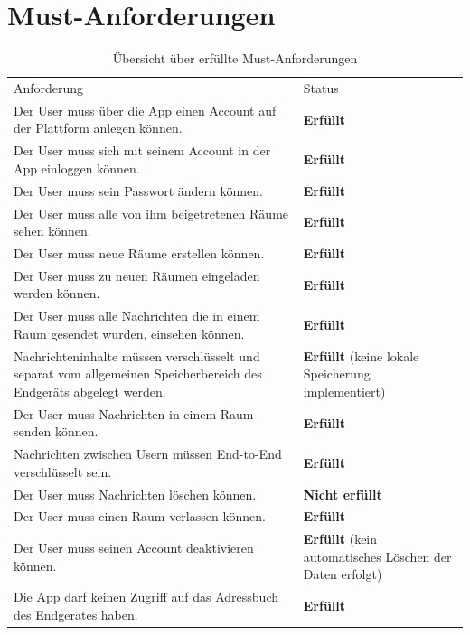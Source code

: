     \newpage
    \section{Must-Anforderungen}\label{sec:must-anforderungen}
    \begin{table}[h]
        \centering
        \begin{tabular}{p{}|p{}}
            Anforderung & Status\\
            \cline{1-2}
            Der User muss über die App einen Account auf der Plattform anlegen können.
            &  \textbf{Erfüllt} \\
            \cline{1-2}
            Der User muss sich mit seinem Account in der App einloggen können. &  \textbf{Erfüllt} \\
            \cline{1-2}
            Der User muss sein Passwort ändern können. & \textbf{Erfüllt}  \\
            \cline{1-2}
            Der User muss alle von ihm beigetretenen Räume sehen können. &  \textbf{Erfüllt} \\
            \cline{1-2}
            Der User muss neue Räume erstellen können. & \textbf{Erfüllt} \\
            \cline{1-2}
            Der User muss zu neuen Räumen eingeladen werden können. & \textbf{Erfüllt} \\
            \cline{1-2}
            Der User muss alle Nachrichten die in einem Raum gesendet wurden, einsehen können. & \textbf{Erfüllt} \\
            \cline{1-2}
            Nachrichteninhalte müssen verschlüsselt und separat vom allgemeinen Speicherbereich des Endgeräts abgelegt werden. & \textbf{Erfüllt} (keine lokale Speicherung implementiert) \\
            \cline{1-2}
            Der User muss Nachrichten in einem Raum senden können. & \textbf{Erfüllt} \\
            \cline{1-2}
            Nachrichten zwischen Usern müssen End-to-End verschlüsselt sein. & \textbf{Erfüllt} \\
            \cline{1-2}
            Der User muss Nachrichten löschen können. & \textbf{Nicht erfüllt} \\
            \cline{1-2}
            Der User muss einen Raum verlassen können. & \textbf{Erfüllt} \\
            \cline{1-2}
            Der User muss seinen Account deaktivieren können. & \textbf{Erfüllt} (kein automatisches Löschen der Daten erfolgt)\\
            \cline{1-2}
            Die App darf keinen Zugriff auf das Adressbuch des Endgerätes haben. & \textbf{Erfüllt}
        \end{tabular}
        \caption{Übersicht über erfüllte Must-Anforderungen}
        \label{tab:erfüllte-must-anforderungen}
    \end{table}

